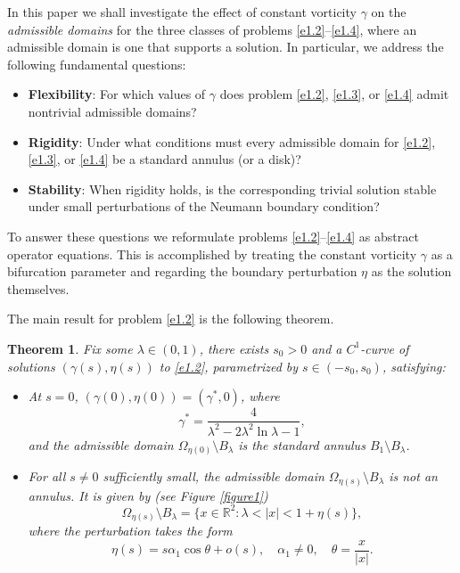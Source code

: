 \documentclass[reqno]{amsart}
\numberwithin{equation}{section}
\newtheorem{theorem}{Theorem}[section]
\numberwithin{equation}{section}
\numberwithin{equation}{section}
\begin{document}
In this paper we shall investigate the effect of constant vorticity \(\gamma\) on the \emph{admissible domains} for the three classes of problems \eqref{e1.2}--\eqref{e1.4}, where an admissible domain is one that supports a solution. In particular, we address the following fundamental questions:
\begin{itemize}
\item \textbf{Flexibility}: For which values of \(\gamma\) does problem \eqref{e1.2}, \eqref{e1.3}, or \eqref{e1.4} admit nontrivial admissible domains?
\item \textbf{Rigidity}: Under what conditions must every admissible domain for \eqref{e1.2}, \eqref{e1.3}, or \eqref{e1.4} be a standard annulus (or a disk)?
\item \textbf{Stability}: When rigidity holds, is the corresponding trivial solution stable under small perturbations of the Neumann boundary condition?
\end{itemize}

To answer these questions we reformulate problems \eqref{e1.2}--\eqref{e1.4} as abstract operator equations. This is accomplished by treating the constant vorticity \(\gamma\) as a bifurcation parameter and regarding the boundary perturbation \(\eta\) as the solution themselves.

The main result for problem \eqref{e1.2} is the following theorem.

\begin{theorem}\label{thm1.1}
Fix some \(\lambda \in (0,1)\), there exists \(s_0 > 0\) and a \(C^1\)-curve of solutions \((\gamma(s), \eta(s))\) to \eqref{e1.2}, parametrized by \(s \in (-s_0, s_0)\), satisfying:
\begin{itemize}
\item[(1)] At \(s = 0\), \((\gamma(0), \eta(0)) = (\gamma^*, 0)\), where
\[
\gamma^* = \frac{4}{\lambda^2 - 2\lambda^2 \ln \lambda - 1},
\]
and the admissible domain \(\Omega_{\eta(0)} \setminus B_\lambda\) is the standard annulus \(B_1 \setminus B_\lambda\).

\item[(2)] For all \(s \neq 0\) sufficiently small, the admissible domain \(\Omega_{\eta(s)} \setminus B_\lambda\) is not an annulus. It is given by (see Figure \ref{figure1})
\[
\Omega_{\eta(s)} \setminus B_\lambda = \{ x \in \mathbb{R}^2 : \lambda < |x| < 1 + \eta(s) \},
\]
where the perturbation takes the form
\[
\eta(s) = s \alpha_1 \cos \theta + o(s), \quad \alpha_1 \neq 0, \quad \theta = \frac{x}{|x|}.
\]
\end{itemize}
\end{theorem}
\end{document}
